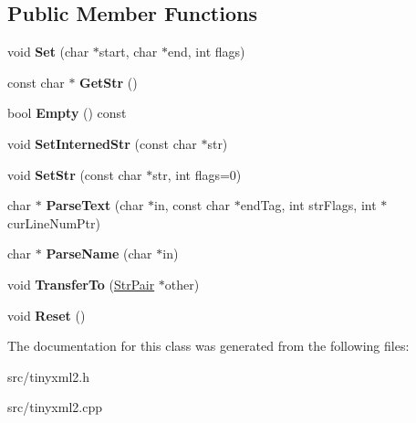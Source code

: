 \subsection*{Public Member Functions}
\begin{DoxyCompactItemize}
\item 
\mbox{\label{classCPlantBox_1_1tinyxml2_1_1StrPair_aae1690b8d1dc34bcbae3865515b702f6}} 
void {\bfseries Set} (char $\ast$start, char $\ast$end, int flags)
\item 
\mbox{\label{classCPlantBox_1_1tinyxml2_1_1StrPair_a52b7b57e7d43d37e7e38d550e0ab3b1c}} 
const char $\ast$ {\bfseries Get\+Str} ()
\item 
\mbox{\label{classCPlantBox_1_1tinyxml2_1_1StrPair_a1fc9d90e0dd6ac9578ef3c2f222b5a25}} 
bool {\bfseries Empty} () const
\item 
\mbox{\label{classCPlantBox_1_1tinyxml2_1_1StrPair_ac69990430389f8ded1f9d0316991d33d}} 
void {\bfseries Set\+Interned\+Str} (const char $\ast$str)
\item 
\mbox{\label{classCPlantBox_1_1tinyxml2_1_1StrPair_a7424c4c297bbaaf39f5f84dd64fa3543}} 
void {\bfseries Set\+Str} (const char $\ast$str, int flags=0)
\item 
\mbox{\label{classCPlantBox_1_1tinyxml2_1_1StrPair_a183c32b2709ef10fa9ee692d0228ce72}} 
char $\ast$ {\bfseries Parse\+Text} (char $\ast$in, const char $\ast$end\+Tag, int str\+Flags, int $\ast$cur\+Line\+Num\+Ptr)
\item 
\mbox{\label{classCPlantBox_1_1tinyxml2_1_1StrPair_a8dca59436788edc355251b19b9f35ace}} 
char $\ast$ {\bfseries Parse\+Name} (char $\ast$in)
\item 
\mbox{\label{classCPlantBox_1_1tinyxml2_1_1StrPair_a37bef756b6046d1bce7df76cae6bdb3c}} 
void {\bfseries Transfer\+To} (\hyperlink{classCPlantBox_1_1tinyxml2_1_1StrPair}{Str\+Pair} $\ast$other)
\item 
\mbox{\label{classCPlantBox_1_1tinyxml2_1_1StrPair_aee6b4775b5112c33dd5ccfa4bf5e3c06}} 
void {\bfseries Reset} ()
\end{DoxyCompactItemize}


The documentation for this class was generated from the following files\+:\begin{DoxyCompactItemize}
\item 
src/tinyxml2.\+h\item 
src/tinyxml2.\+cpp\end{DoxyCompactItemize}
